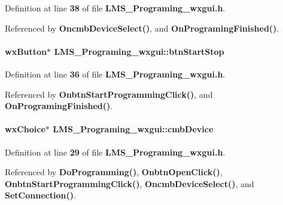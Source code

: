 Definition at line {\bf 38} of file {\bf L\+M\+S\+\_\+\+Programing\+\_\+wxgui.\+h}.



Referenced by {\bf Oncmb\+Device\+Select()}, and {\bf On\+Programing\+Finished()}.

\paragraph[{btn\+Start\+Stop}]{\setlength{\rightskip}{0pt plus 5cm}wx\+Button$\ast$ L\+M\+S\+\_\+\+Programing\+\_\+wxgui\+::btn\+Start\+Stop\hspace{0.3cm}{\ttfamily [protected]}}\label{classLMS__Programing__wxgui_afe55e098967f77725e7c6cdbbb4e3a0b}


Definition at line {\bf 36} of file {\bf L\+M\+S\+\_\+\+Programing\+\_\+wxgui.\+h}.



Referenced by {\bf Onbtn\+Start\+Programming\+Click()}, and {\bf On\+Programing\+Finished()}.

\paragraph[{cmb\+Device}]{\setlength{\rightskip}{0pt plus 5cm}wx\+Choice$\ast$ L\+M\+S\+\_\+\+Programing\+\_\+wxgui\+::cmb\+Device\hspace{0.3cm}{\ttfamily [protected]}}\label{classLMS__Programing__wxgui_a348326450f18c9eda0d5904d88ddab31}


Definition at line {\bf 29} of file {\bf L\+M\+S\+\_\+\+Programing\+\_\+wxgui.\+h}.



Referenced by {\bf Do\+Programming()}, {\bf Onbtn\+Open\+Click()}, {\bf Onbtn\+Start\+Programming\+Click()}, {\bf Oncmb\+Device\+Select()}, and {\bf Set\+Connection()}.

